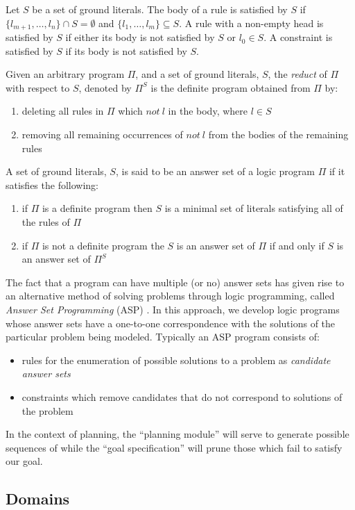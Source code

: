 \documentclass{article}
\newcommand{\intersection}{\ensuremath{\cap}}
\begin{document}
Let $S$ be a set of ground literals. The body of a rule is satisfied by $S$ if $\{l_{m+1},\ldots,l_{n}\} \intersection S = \emptyset$ and $\{l_{1},\ldots,l_{m}\} \subseteq S$. A rule with a non-empty head is satisfied by $S$ if either its body is not satisfied by $S$ or $l_{0} \in S$. A constraint is satisfied by $S$ if its body is not satisfied by $S$.

Given an arbitrary program $\Pi$, and a set of ground literals, $S$, the \emph{reduct} of $\Pi$ with respect to $S$, denoted by $\Pi^{S}$ is the definite program obtained from $\Pi$ by:
\begin{enumerate}
    \item deleting all rules in $\Pi$ which $not \: l$ in the body, where $l \in S$
    \item removing all remaining occurrences of $not \: l$ from the bodies of the remaining rules
\end{enumerate}
A set of ground literals, $S$, is said to be an answer set of a logic program $\Pi$ if it satisfies the following:
\begin{enumerate}
    \item if $\Pi$ is a definite program then $S$ is a minimal set of literals satisfying all of the rules of $\Pi$
    \item if $\Pi$ is not a definite program the $S$ is an answer set of $\Pi$ if and only if $S$ is an answer set of $\Pi^{S}$
\end{enumerate}

The fact that a program can have multiple (or no) answer sets has given rise to an alternative method of solving problems through logic programming, called \emph{Answer Set Programming} (ASP) \cite{Marek99,Niemela99}. In this approach, we develop logic programs whose answer sets have a one-to-one correspondence with the solutions of the particular problem being modeled. Typically an ASP program consists of:
\begin{itemize}
    \item rules for the enumeration of possible solutions to a problem as \emph{candidate answer sets}
    \item constraints which remove candidates that do not correspond to solutions of the problem
\end{itemize}
In the context of planning, the ``planning module'' will serve to generate possible sequences of while the ``goal specification'' will prune those which fail to satisfy our goal. 

\subsection{Domains}
\end{document}
